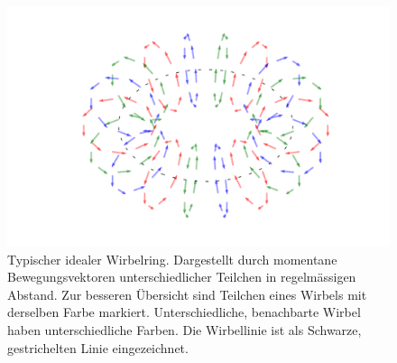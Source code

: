 \begin{figure}
\centering
\includegraphics[width=1\textwidth]{papers/wirbelringe/fig/wirbelring_RGB.pdf}
\caption{Typischer idealer Wirbelring.
Dargestellt durch momentane Bewegungsvektoren unterschiedlicher Teilchen in regelmässigen Abstand.
Zur besseren Übersicht sind Teilchen eines Wirbels mit derselben Farbe markiert.
Unterschiedliche, benachbarte Wirbel haben unterschiedliche Farben.
Die Wirbellinie ist als Schwarze, gestrichelten Linie eingezeichnet.\label{Wirbelringe:fig:generell}}
\end{figure}